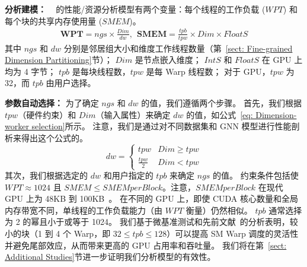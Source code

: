 \textbf{分析建模：}
~\Mname{} 的性能/资源分析模型有两个变量：每个线程的工作负载 ($\mathit{WPT}$) 和每个块的共享内存使用量 ($\mathit{SMEM}$)。
\begin{equation} 
\label{equ: workload per threads}
    \begin{aligned}
        \mathbf{WPT}  = \mathit{ngs}\times\frac{Dim}{\mathit{dw}}, \ \
        \mathbf{SMEM}  =  \frac{\mathit{tpb}}{\mathit{tpw}} \times Dim \times \mathit{FloatS}
    \end{aligned}
\end{equation}
其中 $\mathit{ngs}$ 和 $\mathit{dw}$ 分别是邻居组大小和维度工作线程数量（第~\ref{sect: Fine-grained Dimension Partitioning}节）；
$\mathit{Dim}$ 是节点嵌入维度；
$\mathit{IntS}$ 和 $\mathit{FloatS}$ 在 GPU 上均为 4 字节；
$\mathit{tpb}$ 是每块线程数，$\mathit{tpw}$ 是每 Warp 线程数；
对于 GPU，$\mathit{tpw}$ 为 32，而 $\mathit{tpb}$ 由用户选择。

\textbf{参数自动选择：}
为了确定 $\mathit{ngs}$ 和 $\mathit{dw}$ 的值，我们遵循两个步骤。
首先，我们根据 $\mathit{tpw}$（硬件约束）和 $\mathit{Dim}$（输入属性）来确定 $\mathit{dw}$ 的值，如公式~\ref{eq: Dimension-worker selection}所示。
注意，我们是通过对不同数据集和 GNN 模型进行性能剖析来得出这个公式的。
\begin{equation} \label{eq: Dimension-worker selection}
   \mathit{dw} =
    \begin{cases}
     \mathit{tpw}          &   \mathit{Dim} \geq \mathit{tpw} \\
    \frac{\mathit{tpw}}{2} &   \mathit{Dim} < \mathit{tpw}
    \end{cases}
\end{equation}
其次，我们根据选定的 $\mathit{dw}$ 和用户指定的 $\mathit{tpb}$ 来确定 $\mathit{ngs}$ 的值。
约束条件包括使 $\mathit{WPT} \approx 1024$ 且 $\mathit{SMEM} \leq \mathit{SMEMperBlock}$。注意，$SMEMperBlock$ 在现代 GPU 上为 48KB 到 100KB~\cite{rtx-4060}。
在不同的 GPU 上，即使 CUDA 核心数量和全局内存带宽不同，单线程的工作负载能力（由 $\mathit{WPT}$ 衡量）仍然相似。
$\mathit{tpb}$ 通常选择为 2 的幂且小于或等于 1024。
我们基于微基准测试和先前文献~\cite{merge-spmm}的分析表明，较小的块（1 到 4 个 Warp，即 $32 \leq \mathit{tpb} \leq 128$）可以提高 SM Warp 调度的灵活性并避免尾部效应，从而带来更高的 GPU 占用率和吞吐量。
我们将在第~\ref{sect: Additional Studies}节进一步证明我们分析模型的有效性。

